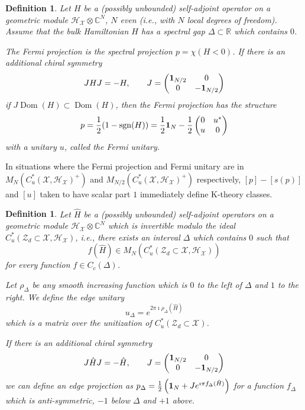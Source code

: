 \documentclass[12pt]{amsart}
\newtheorem{definition}[theorem]{Definition}
\newcommand{\CM}{{\mathbb C}}
\newcommand{\RM}{{\mathbb R}}
\newcommand{\Hh}{{\mathcal H}}
\newcommand{\Xx}{{\mathcal X}}
\newcommand{\Zz}{{\mathcal Z}}
\newcommand{\one}{{\bf 1}}
\newcommand{\sgn}{{\rm sgn}}
\DeclareMathOperator*{\Dom}{Dom}
\begin{document}
\begin{definition}
\label{def:bulk_invariants}
Let $H$ be a (possibly unbounded) self-adjoint operator on a geometric module $\Hh_\Xx \otimes \CM^N$, $N$ even (i.e., with $N$ local degrees of freedom). Assume that the bulk Hamiltonian $H$ has a spectral gap $\Delta\subset \RM$ which contains $0$. 

The Fermi projection is the spectral projection $p = \chi(H<0)$. If there is an additional chiral symmetry
$$J H J = - H, \qquad J = \begin{pmatrix}
\one_{N/2} & 0 \\ 0 & -\one_{N/2}
\end{pmatrix}$$
if $J\Dom(H) \subset \Dom(H)$, then the Fermi projection has the structure
$$p = \frac{1}{2}(1-\sgn(H))=  \frac{1}{2} \one_N - \frac{1}{2} \begin{pmatrix}
    0 & u^* \\ u & 0
\end{pmatrix}$$
with a unitary $u$, called the Fermi unitary.
\end{definition}
In situations where the Fermi projection and Fermi unitary are in $M_N(C^*_u(\Xx,\Hh_\Xx)^+)$ and $M_{N/2}(C^*_u(\Xx,\Hh_\Xx)^+)$ respectively, $[p]-[s(p)]$ and $[u]$ taken to have scalar part $1$ immediately define K-theory classes.
\begin{definition}
\label{def:edge_invariants}
Let $\hat{H}$ be a (possibly unbounded) self-adjoint operators on a geometric module $\Hh_\Xx \otimes \CM^N$ which is invertible modulo the ideal $C^*_u(\Zz_d\subset \Xx,\Hh_\Xx)$, i.e., there exists an interval $\Delta$ which contains $0$ such that
$$f(\hat{H})\in M_N(C^*_u(\Zz_d \subset \Xx,\Hh_\Xx))$$
for every function $f\in C_c(\Delta)$. 

Let $\rho_\Delta$ be any smooth increasing function  which is $0$ to the left of $\Delta$ and $1$ to the right. We define the edge unitary
$$u_\Delta = e^{2\pi \imath \rho_\Delta(\hat{H})}$$
which is a matrix over the unitization of $C^*_u(\Zz_d\subset \Xx)$.
    
If there is an additional chiral symmetry
$$J \hat{H} J = - \hat{H}, \qquad J = \begin{pmatrix}
\one_{N/2} & 0 \\ 0 & -\one_{N/2}
\end{pmatrix}$$
we can define an edge projection as
$p_\Delta = \frac{1}{2}\left(\one_N + Je^{\imath \pi f_\Delta(\hat{H})}\right)$
for a function $f_\Delta$ which is anti-symmetric, $-1$ below $\Delta$ and $+1$ above.
\end{definition}
\end{document}
